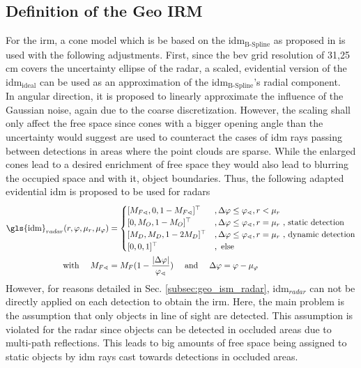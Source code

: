 \subsection{Definition of the Geo IRM}
\label{subsec:method_geo_irm}
For the \gls{irm}, a cone model which is be based on the \gls{idm}$_{\text{B-Spline}}$ as proposed in \cite{loop2016closed} is used with the following adjustments. First, since the \gls{bev} grid resolution of 31,25 cm covers the uncertainty ellipse of the radar, a scaled, evidential version of the \gls{idm}$_{\text{ideal}}$ can be used as an approximation of the \gls{idm}$_{\text{B-Spline}}$'s radial component.
\\
In angular direction, it is proposed to linearly approximate the influence of the Gaussian noise, again due to the coarse discretization. However, the scaling shall only affect the free space since cones with a bigger opening angle than the uncertainty would suggest are used to counteract the cases of \gls{idm} rays passing between detections in areas where the point clouds are sparse. While the enlarged cones lead to a desired enrichment of free space they would also lead to blurring the occupied space and with it, object boundaries. Thus, the following adapted evidential \gls{idm} is proposed to be used for radars
\begin{align}
	\label{eq:idm_radar}
	\text{\gls{idm}}_{radar}(r, \varphi, \mu_r, \mu_\varphi) &= 
	\begin{cases}
		[M_{F\sphericalangle},0,1-M_{F\sphericalangle}]^\top &, \Delta\varphi \leq \varphi_\sphericalangle, r < \mu_r\\
		[0,M_O,1-M_O]^\top &, \Delta\varphi \leq \varphi_\sphericalangle, r = \mu_r \text{ , static detection}\\
		[M_D,M_D,1-2M_D]^\top &, \Delta\varphi \leq \varphi_\sphericalangle,r = \mu_r \text{ , dynamic detection}\\		
		[0,0,1]^\top &, \text{ else}\\
	\end{cases}\\
	\text{with } \quad M_{F\sphericalangle} &= M_F(1 - \dfrac{| \Delta\varphi |}{\varphi_\sphericalangle}) \quad\text{ and }\quad \Delta\varphi = \varphi - \mu_\varphi
\end{align}
However, for reasons detailed in Sec. \ref{subsec:geo_ism_radar}, \gls{idm}$_{radar}$ can not be directly applied on each detection to obtain the \gls{irm}. Here, the main problem is the assumption that only objects in line of sight are detected. This assumption is violated for the radar since objects can be detected in occluded areas due to multi-path reflections. This leads to big amounts of free space being assigned to static objects by \gls{idm} rays cast towards detections in occluded areas. 
